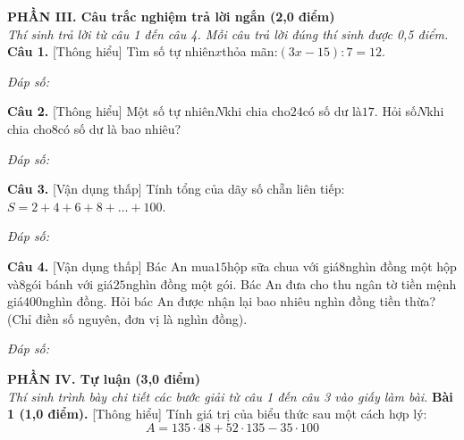 \documentclass[11pt,a4paper]{article}
\begin{document}
\vspace{6pt}
\noindent
\textbf{\large PHẦN III. Câu trắc nghiệm trả lời ngắn (2,0 điểm)}\\
\textit{\small Thí sinh trả lời từ câu 1 đến câu 4. Mỗi câu trả lời đúng thí sinh được 0,5 điểm.}
\vspace{6pt}
\noindent\textbf{Câu 1.} [Thông hiểu] Tìm số tự nhiên$x$thỏa mãn:$(3x - 15) : 7 = 12$.\par\vspace{2pt}
\noindent\textit{Đáp số:} \dotfill\par\vspace{6pt}

\noindent\textbf{Câu 2.} [Thông hiểu] Một số tự nhiên$N$khi chia cho$24$có số dư là$17$. Hỏi số$N$khi chia cho$8$có số dư là bao nhiêu?\par\vspace{2pt}
\noindent\textit{Đáp số:} \dotfill\par\vspace{6pt}

\noindent\textbf{Câu 3.} [Vận dụng thấp] Tính tổng của dãy số chẵn liên tiếp:$S = 2 + 4 + 6 + 8 + \dots + 100$.\par\vspace{2pt}
\noindent\textit{Đáp số:} \dotfill\par\vspace{6pt}

\noindent\textbf{Câu 4.} [Vận dụng thấp] Bác An mua$15$hộp sữa chua với giá$8$nghìn đồng một hộp và$8$gói bánh với giá$25$nghìn đồng một gói. Bác An đưa cho thu ngân tờ tiền mệnh giá$400$nghìn đồng. Hỏi bác An được nhận lại bao nhiêu nghìn đồng tiền thừa? (Chỉ điền số nguyên, đơn vị là nghìn đồng).\par\vspace{2pt}
\noindent\textit{Đáp số:} \dotfill\par\vspace{6pt}


\vspace{6pt}
\noindent
\textbf{\large PHẦN IV. Tự luận (3,0 điểm)}\\
\textit{\small Thí sinh trình bày chi tiết các bước giải từ câu 1 đến câu 3 vào giấy làm bài.}
\vspace{6pt}
\noindent\textbf{Bài 1 (1,0 điểm).} [Thông hiểu] Tính giá trị của biểu thức sau một cách hợp lý:$$A = 135 \cdot 48 + 52 \cdot 135 - 35 \cdot 100$$\par\vspace{8pt}
\end{document}
